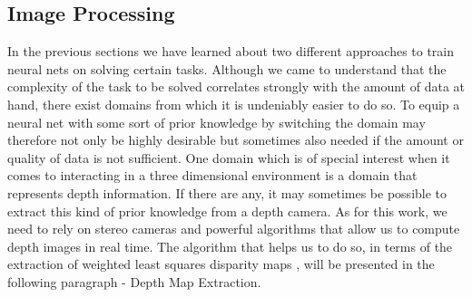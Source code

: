\subsection{Image Processing}
\label{sec::324_ip}
In the previous sections we have learned about two different approaches to train neural nets on solving certain tasks. Although we came to understand that the complexity of the task to be solved correlates strongly with the amount of data at hand, there exist domains from which it is undeniably easier to do so. To equip a neural net with some sort of prior knowledge by switching the domain may therefore not only be highly desirable but sometimes also needed if the amount or quality of data is not sufficient. One domain which is of special interest when it comes to interacting in a three dimensional environment is a domain that represents depth information. If there are any, it may sometimes be possible to extract this kind of prior knowledge from a depth camera. As for this work, we need to rely on stereo cameras and powerful algorithms that allow us to compute depth images in real time. The algorithm that helps us to do so, in terms of the extraction of weighted least squares disparity maps \cite{min2014fast}, will be presented in the following paragraph - Depth Map Extraction.
